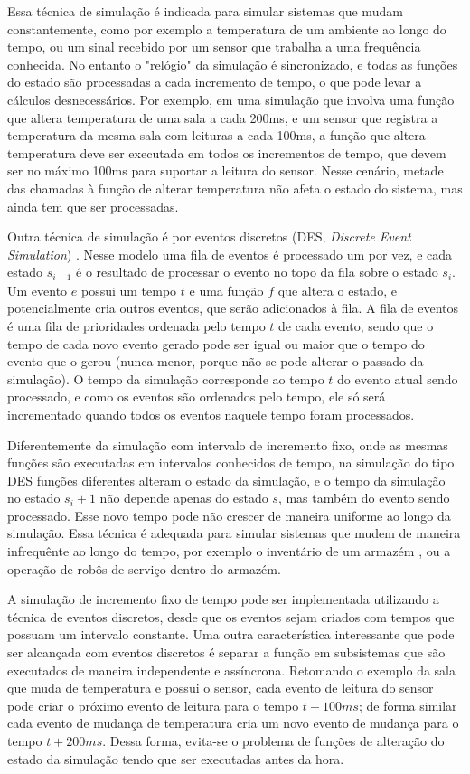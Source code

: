 Essa técnica de simulação é indicada para simular sistemas que mudam constantemente, como por exemplo a temperatura de um ambiente ao longo do tempo, ou um sinal recebido por um sensor que trabalha a uma frequência conhecida. No entanto o  "relógio" da simulação é sincronizado, e todas as funções do estado são processadas a cada incremento de tempo, o que pode levar a cálculos desnecessários. Por exemplo, em uma simulação que involva uma função que altera temperatura de uma sala a cada 200ms, e um sensor que registra a temperatura da mesma sala com leituras a cada 100ms, a função que altera temperatura deve ser executada em todos os incrementos de tempo, que devem ser no máximo 100ms para suportar a leitura do sensor. Nesse cenário, metade das chamadas à função de alterar temperatura não afeta o estado do sistema, mas ainda tem que ser processadas.

Outra técnica de simulação é por eventos discretos (DES, \textit{Discrete Event Simulation}) \cite{matloff2008desintro}. Nesse modelo uma fila de eventos é processado um por vez, e cada estado $s_{i+1}$ é o resultado de processar o evento no topo da fila sobre o estado $s_i$. Um evento $e$ possui um tempo $t$ e uma função $f$ que altera o estado, e potencialmente cria outros eventos, que serão adicionados à fila. A fila de eventos é uma fila de prioridades ordenada pelo tempo $t$ de cada evento, sendo que o tempo de cada novo evento gerado pode ser igual ou maior que o tempo do evento que o gerou (nunca menor, porque não se pode alterar o passado da simulação). O tempo da simulação corresponde ao tempo $t$ do evento atual sendo processado, e como os eventos são ordenados pelo tempo, ele só será incrementado quando todos os eventos naquele tempo foram processados.

Diferentemente da simulação com intervalo de incremento fixo, onde as mesmas funções são executadas em intervalos conhecidos de tempo, na simulação do tipo DES funções diferentes alteram o estado da simulação, e o tempo da simulação no estado $s_i+1$ não depende apenas do estado $s$, mas também do evento sendo processado. Esse novo tempo pode não crescer de maneira uniforme ao longo da simulação. Essa técnica é adequada para simular sistemas que mudem de maneira infrequênte ao longo do tempo, por exemplo o inventário de um armazém \cite{belanger2010aboutsimulation}, ou a operação de robôs de serviço dentro do armazém. 

A simulação de incremento fixo de tempo pode ser implementada utilizando a técnica de eventos discretos, desde que os eventos sejam criados com tempos que possuam um intervalo constante. Uma outra característica interessante que pode ser alcançada com eventos discretos é separar a função em subsistemas que são executados de maneira independente e assíncrona. Retomando o exemplo da sala que muda de temperatura e possui o sensor, cada evento de leitura do sensor pode criar o próximo evento de leitura para o tempo $t + 100ms$; de forma similar cada evento de mudança de temperatura cria um novo evento de mudança para o tempo $t + 200ms$. Dessa forma, evita-se o problema de funções de alteração do estado da simulação tendo que ser executadas antes da hora.

